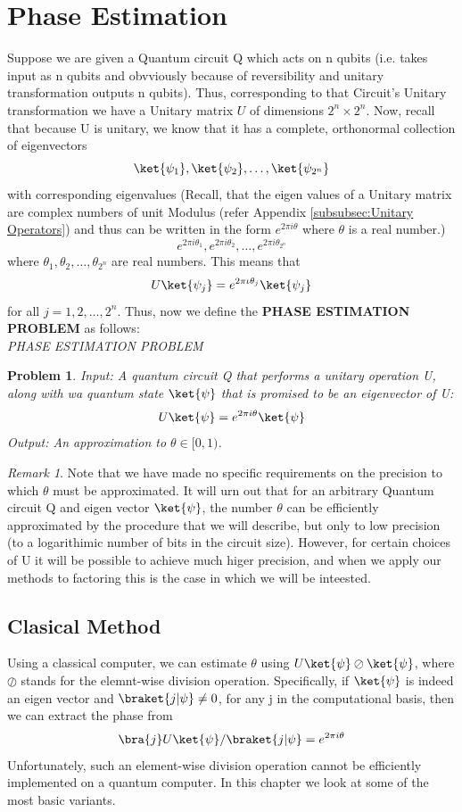\documentclass[12pt, oneside]{book}
\newtheorem{problem}{Problem}[section]
\theoremstyle{definition}
\theoremstyle{definition}
\theoremstyle{remark}
\newtheorem*{remark}{Remark}
\begin{document}
\section{Phase Estimation}
Suppose we are given a Quantum circuit Q which acts on n qubits (i.e. takes input as n qubits and obvviously because of reversibility and unitary transformation outputs n qubits).
Thus, corresponding to that Circuit's Unitary transformation we have a Unitary matrix $U$ of dimensions $2^n \times 2^n$.
Now, recall that because U is unitary, we know that it has a complete, orthonormal collection of eigenvectors
\[
\ket{\psi_1},\ket{\psi_2},\ldots,\ket{\psi_{2^n}}
\]
with corresponding eigenvalues (Recall, that the eigen values of a Unitary matrix are complex numbers of unit Modulus (refer Appendix \ref{subsubsec:Unitary Operators})
and thus can be written in the form $e^{2\pi i \theta}$ where $\theta$ is a real number.)
\[
e^{2\pi i \theta_1},e^{2\pi i \theta_2},\ldots,e^{2\pi i \theta_{2^n}}
\]
where $\theta_1,\theta_2,\ldots,\theta_{2^n}$ are real numbers. This means that 
\[
U\ket{\psi_j}=e^{2\pi\iota \theta_j}\ket{\psi_j}
\]
for all $j=1,2,\ldots,2^n$. Thus, now we define the \textbf{PHASE ESTIMATION PROBLEM} as follows:\\
\textit{PHASE ESTIMATION PROBLEM}
\begin{problem}
    Input: A quantum circuit Q that performs a unitary operation U, along with wa quantum state $\ket{\psi}$ that is promised to be an eigenvector of U:
    \[
    U\ket{\psi}=e^{2\pi i \theta}\ket{\psi}
    \]
    Output: An approximation to $\theta \in [0,1)$.
\end{problem}

\begin{remark}
    Note that we have made no specific requirements on the precision to which $\theta$ must be approximated. 
    It will urn out that for an arbitrary Quantum circuit Q and eigen vector $\ket{\psi}$, the number $\theta$ can be efficiently approximated by the procedure that we will describe, but only to low precision (to a logarithimic number of bits in the circuit size).
    However, for certain choices of U it will be possible to achieve much higer precision, and when we apply our methods to factoring this is the case in which we will be inteested.
\end{remark}

\subsection{Clasical Method}
Using a classical computer, we can estimate $\theta$ using $U\ket{\psi} \oslash \ket{\psi}$, where $\oslash$ stands for the elemnt-wise division operation. Specifically, 
if $\ket{\psi}$ is indeed an eigen vector and $\braket{j|\psi}\neq 0$, for any j in the computational basis, then we can extract the phase from
\[
\bra{j}U\ket{\psi}/\braket{j|\psi}=e^{2\pi i \theta}
\]
Unfortunately, such an element-wise division operation cannot be efficiently implemented on a quantum computer.
In this chapter we look at some of the most basic variants.
\end{document}
